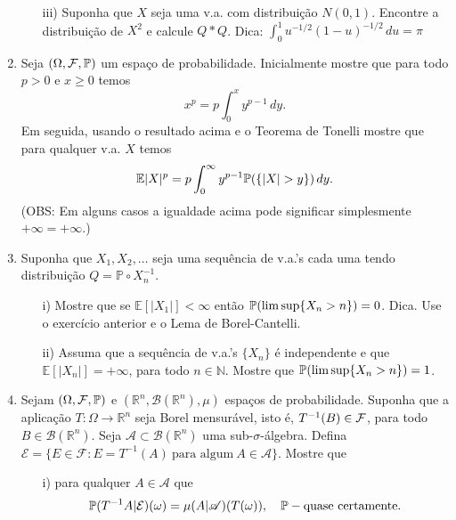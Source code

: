 \begin{enumerate}[leftmargin=*]
\begin{itemize}
	
	\item[iii)] 	
	Suponha que $X$ seja uma v.a. com distribuição $N(0,1)$.
	Encontre a distribuição de $X^2$ e calcule $Q*Q$.
	Dica: $ \int_{0}^{1} u^{-1/2}(1-u)^{-1/2}\, du= \pi $
	\end{itemize}




	





\item Seja $(\Omega,\F,\P)$ um espaço de probabilidade.
Inicialmente mostre que para todo $p>0$ e $x\geq 0$ temos 
	\[
		x^p = p \int_{0}^{x} y^{p-1} \, dy. 	
	\]
Em seguida, usando o resultado acima e o Teorema de Tonelli 
mostre que para qualquer v.a. $X$ temos 	 
	\[
		\mathbb{E}|X|^p 
		= 
		p\int_{0}^{\infty} y^{p-1} \P(\{|X|>y\})\, dy.
	\]
(OBS: Em alguns casos a igualdade acima pode 
significar simplesmente $+\infty=+\infty$.)









\item
Suponha que $X_1,X_2,\ldots$ seja uma sequência de v.a.'s  
cada uma tendo distribuição $Q=\mathbb{P}\circ X_n^{-1}$.
	\begin{itemize}
		\item[i)] 
		Mostre que se $\mathbb{E}[|X_1|]<\infty$
		então $\P(\limsup \{X_n>n\})=0$.
		Dica. Use o exercício anterior e o Lema de Borel-Cantelli.
		
		\item[ii)] 
		Assuma que a sequência de v.a.'s $\{X_n\}$ é independente e
		que $\mathbb{E}[|X_n|]=+\infty$, para todo $n\in\mathbb{N}$.
		Mostre que $\P(\limsup \{X_n>n\})=1$. 
	\end{itemize}





\item
Sejam $(\Omega,\F,\P)$ e $(\mathbb{R}^n,\mathscr{B}(\mathbb{R}^n),\mu)$
espaços de probabilidade.
Suponha que a aplicação $T:\Omega\to\mathbb{R}^n$ seja  
Borel mensurável, isto é, $T^{-1}(B)\in \F$, para todo 
$B\in \mathscr{B}(\mathbb{R}^n)$.
Seja $\mathscr{A}\subset \mathscr{B}(\mathbb{R}^n)$ uma 
sub-$\sigma$-álgebra. Defina 
$
\mathcal{E}= 
\{E\in \mathcal{F}: 
E=T^{-1}(A)\ \text{para algum}\ A\in\mathscr{A}\}.
$
Mostre que 
%
%
	\begin{itemize}
		\item[i)]
		para qualquer $A\in \mathscr{A}$ que 
		\[
		\P(T^{-1}A|\mathcal{E})(\omega)
		=
		\mu(A|\mathscr{A})(T(\omega)),
		\quad \P-\text{quase certamente}. 
		\]	
		

\end{itemize}
\end{enumerate}

